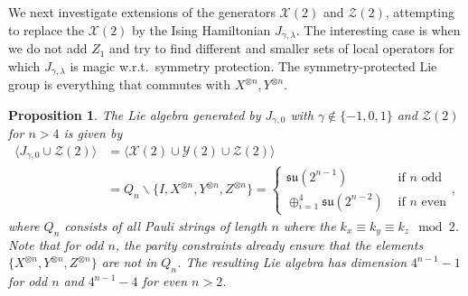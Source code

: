 \documentclass[12pt, a4-paper]{amsart}
\newcommand{\cX}{\mathcal{X}}
\newcommand{\cY}{\mathcal{Y}}
\newcommand{\cZ}{\mathcal{Z}}
\newcommand{\mf}[1]{\mathfrak{#1}}
\numberwithin{equation}{section}
\newtheorem{prop}[lemma]{Proposition}
\begin{document}
We next investigate extensions of the generators $\cX(2)$ and $\cZ(2)$, attempting to replace the $\cX(2)$ by the Ising Hamiltonian $J_{\gamma, \lambda}$. The interesting case is when we do not add $Z_1$ and try to find different and smaller sets of local operators for which $J_{\gamma, \lambda}$ is magic w.r.t.\ symmetry protection. The symmetry-protected Lie group is everything that commutes with $X^{\otimes n},Y^{\otimes n}$.


\begin{prop}\label{prop:J_doublyZ}
    The Lie algebra generated by $J_{\gamma, 0}$ with $\gamma \notin \{-1,0,1\}$ and $\cZ(2)$ for $n>4$ is given by
    \begin{equation}
    \begin{aligned}
        \langle J_{\gamma, 0} \cup \cZ(2) \rangle &= \langle \cX(2) \cup \cY(2) \cup \cZ(2) \rangle \\
        &= Q_n \backslash \{I, X^{\otimes n}, Y^{\otimes n}, Z^{\otimes n} \} = \begin{cases}
            \mf{su}(2^{n-1}) &\text{ if $n$ odd} \\
            \oplus_{i=1}^{4}\mf{su}(2^{n-2}) &\text{ if $n$ even}
        \end{cases},
    \end{aligned}
    \end{equation}
    where $Q_n$ consists of all Pauli strings of length $n$ where the $k_x \equiv k_y \equiv k_z \mod{2}$. Note that for odd $n$, the parity constraints already ensure that the elements $\{X^{\otimes n}, Y^{\otimes n}, Z^{\otimes n} \}$ are not in $Q_n$. The resulting Lie algebra has dimension $4^{n-1}-1$ for odd $n$ and $4^{n-1}-4$ for even $n>2$.
\end{prop}
\end{document}
